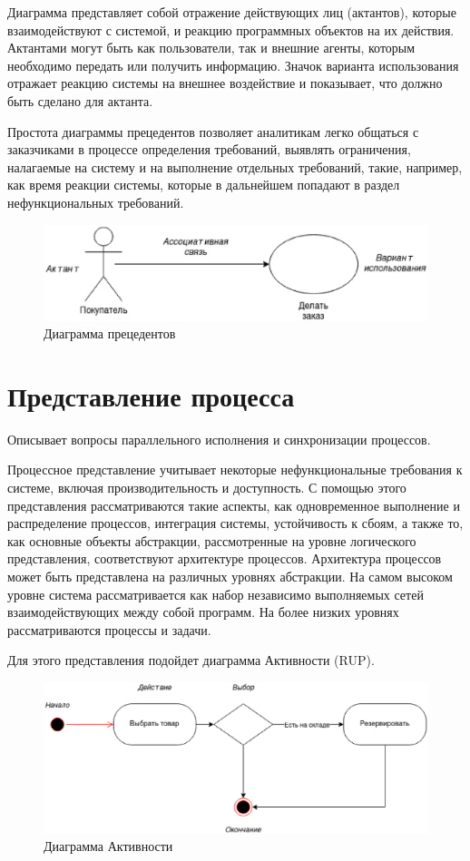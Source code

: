 Диаграмма представляет собой отражение действующих лиц (актантов), которые взаимодействуют с системой, и реакцию программных объектов на их действия. Актантами могут быть как пользователи, так и внешние агенты, которым необходимо передать или получить информацию. Значок варианта использования отражает реакцию системы на внешнее воздействие и показывает, что должно быть сделано для актанта.

Простота диаграммы прецедентов позволяет аналитикам легко общаться с заказчиками в процессе определения требований, выявлять ограничения, налагаемые на систему и на выполнение отдельных требований, такие, например, как время реакции системы, которые в дальнейшем попадают в раздел нефункциональных требований.

\begin{figure}[h!]
        \centering
        \includegraphics[width=\textwidth]{images/4/1.eps}
        \caption{Диаграмма прецедентов}
\end{figure}

\section{Представление процесса}

Описывает вопросы параллельного исполнения и синхронизации процессов.

Процессное представление учитывает некоторые нефункциональные требования к системе, включая производительность и доступность. С помощью этого представления рассматриваются такие аспекты, как одновременное выполнение и распределение процессов, интеграция системы, устойчивость к сбоям, а также то, как основные объекты абстракции, рассмотренные на уровне логического представления, соответствуют архитектуре процессов. Архитектура процессов может быть представлена на различных уровнях абстракции. На самом высоком уровне система рассматривается как набор независимо выполняемых сетей взаимодействующих между собой программ. На более низких уровнях рассматриваются процессы и задачи.

Для этого представления подойдет диаграмма Активности (RUP).

\begin{figure}[h!]
        \centering
        \includegraphics[width=\textwidth]{images/4/2.eps}
        \caption{Диаграмма Активности}
\end{figure}

